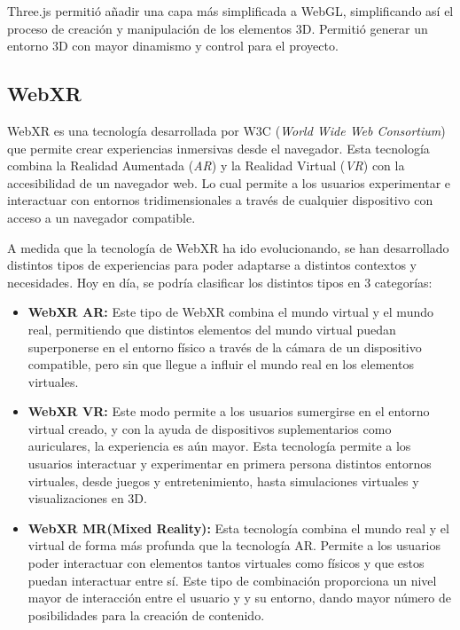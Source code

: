\documentclass[a4paper, 12pt]{book}
\begin{document}
Three.js permitió añadir una capa más simplificada a WebGL, simplificando así el proceso de creación y manipulación de los elementos 3D. Permitió generar un entorno 3D con mayor dinamismo y control para el proyecto.

\subsection{WebXR}
\label{subsec:WebXR}

WebXR \cite{onirix2024} es una tecnología desarrollada por W3C (\textit{World Wide Web Consortium}) que permite crear experiencias inmersivas desde el navegador. Esta tecnología combina la Realidad Aumentada (\textit{AR}) y la Realidad Virtual (\textit{VR}) con la accesibilidad de un navegador web.
Lo cual permite a los usuarios experimentar e interactuar con entornos tridimensionales a través de cualquier dispositivo con acceso a un navegador compatible.

A medida que la tecnología de WebXR ha ido evolucionando, se han desarrollado distintos tipos de experiencias para poder adaptarse a distintos contextos y necesidades. Hoy en día, se podría clasificar los distintos tipos en 3 categorías:
\begin{itemize}
  \item \textbf{WebXR AR:} Este tipo de WebXR combina el mundo virtual y el mundo real, permitiendo que distintos elementos del mundo virtual puedan superponerse en el entorno físico a través
        de la cámara de un dispositivo compatible, pero sin que llegue a influir el mundo real en los elementos virtuales.
  \item \textbf{WebXR VR:} Este modo permite a los usuarios sumergirse en el entorno virtual creado, y con la ayuda de dispositivos suplementarios como auriculares, la experiencia es aún mayor. Esta tecnología permite a los usuarios
        interactuar y experimentar en primera persona distintos entornos virtuales, desde juegos y entretenimiento, hasta simulaciones virtuales y visualizaciones en 3D.
  \item \textbf{WebXR MR(Mixed Reality):} Esta tecnología combina el mundo real y el virtual de forma más profunda que la tecnología AR. Permite a los usuarios poder interactuar con elementos tantos virtuales como físicos y que estos puedan interactuar entre sí. Este tipo de combinación proporciona un nivel mayor de interacción entre el usuario y
        y su entorno, dando mayor número de posibilidades para la creación de contenido.
\end{itemize}
\end{document}
